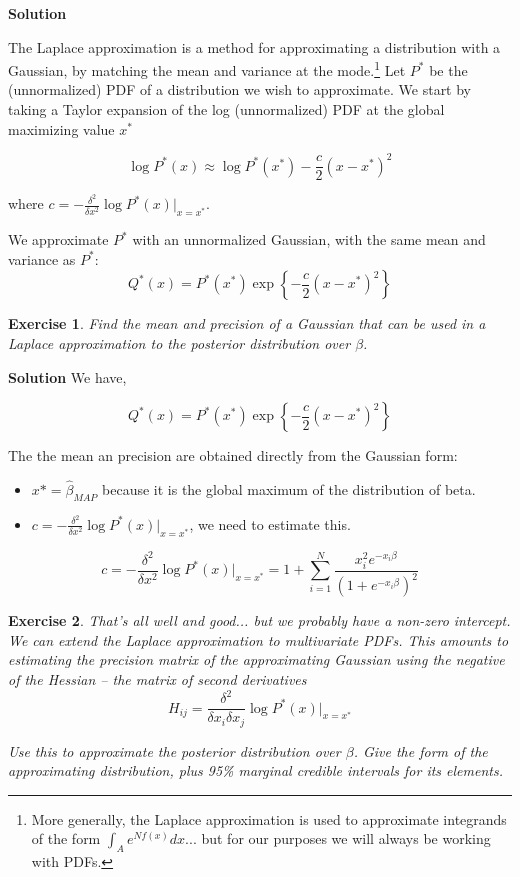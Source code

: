 \documentclass[twoside]{article}
\newcounter{lecnum}
\newtheorem{exercise}{Exercise}[lecnum]
\begin{document}
{\color{blue}
	\textbf{Solution}
	
	
} %

The Laplace approximation is a method for approximating a distribution with a Gaussian, by matching the mean and variance at the mode.\footnote{More generally, the Laplace approximation is used to approximate integrands of the form $\int_A e^{Nf(x)} dx$... but for our purposes we will always be working with PDFs.} Let $P^*$ be the (unnormalized) PDF  of a distribution we wish to approximate. We start by taking a Taylor expansion of the log (unnormalized) PDF at the global maximizing value $x^*$

$$\log P^*(x) \approx \log P^*(x^*) - \frac{c}{2}(x-x^*)^2$$

where $c = -\frac{\delta^2}{\delta x^2}\log P^*(x)\Big\rvert_{x=x^*}$.

We approximate $P^*$ with an unnormalized Gaussian, with the same mean and variance as $P^*$:
$$Q^*(x) = P^*(x^*)\exp\left\{-\frac{c}{2}(x-x^*)^2\right\}$$




\begin{exercise}
  Find the mean and precision of a Gaussian that can be used in a Laplace approximation to the posterior distribution over $\beta$.
\end{exercise}

{\color{blue}
	\textbf{Solution}
	We have,
	
	$$Q^*(x) = P^*(x^*)\exp\left\{-\frac{c}{2}(x-x^*)^2\right\}$$
	
	The the mean an precision are obtained directly from the Gaussian form:
	\begin{itemize}
		\item $x* = \hat{\beta}_{MAP}$ because it is the global maximum of the distribution of beta.
		\item $c = -\frac{\delta^2}{\delta x^2}\log P^*(x)\Big\rvert_{x=x^*} $, we need to estimate this.
	\end{itemize}
	$$ c = -\frac{\delta^2}{\delta x^2}\log P^*(x)\Big\rvert_{x=x^*} 
	= 1 + \sum_{i=1}^{N} \frac{x_i^2 e^{-x_i \beta}}{(1+e^{-x_i \beta})^2} 
	$$
} %



\begin{exercise}
  That's all well and good... but we probably have a non-zero intercept.  We can extend the Laplace approximation to multivariate PDFs. This amounts to estimating the precision matrix of the approximating Gaussian using the negative of the Hessian -- the matrix of second derivatives
$$H_{ij} = \frac{\delta^2}{\delta x_i \delta x_j}\log P^*(x)\Big\rvert_{x=x^*}$$

  Use this to approximate the posterior distribution over $\beta$. Give the form of the approximating distribution, plus 95\% marginal credible intervals for its elements.
\end{exercise}
\end{document}
